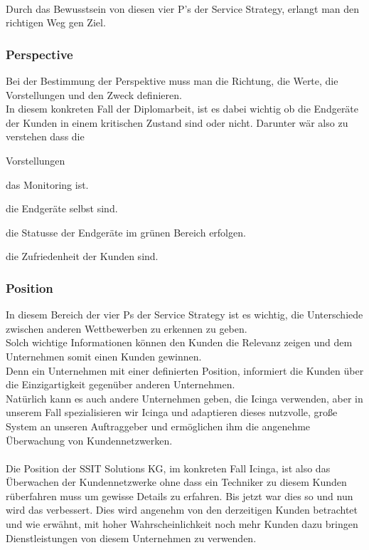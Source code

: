 {\noindent
\\
Durch das Bewusstsein von diesen vier P's der Service Strategy, erlangt man den richtigen Weg gen Ziel.

\subsubsection{Perspective}
\label{chap: Perspective}

Bei der Bestimmung der Perspektive muss man die Richtung, die Werte, die Vorstellungen und den Zweck definieren.
\\
In diesem konkreten Fall der Diplomarbeit, ist es dabei wichtig ob die Endgeräte der Kunden in einem kritischen Zustand
sind oder nicht. Darunter wär also zu verstehen dass die 
\begin{labeling}{Vorstellungen}
    \item [Richtung] das Monitoring ist.
    \item [Werte] die Endgeräte selbst sind.
    \item [Vorstellungen] die Statusse der Endgeräte im grünen Bereich erfolgen.
    \item [Zwecke] die Zufriedenheit der Kunden sind.
\end{labeling}

\subsubsection{Position}
\label{chap: Position}

In diesem Bereich der vier Ps der Service Strategy ist es wichtig, die Unterschiede zwischen anderen Wettbewerben zu erkennen zu geben.
\\
Solch wichtige Informationen können den Kunden die Relevanz zeigen und dem Unternehmen somit einen Kunden gewinnen.
\\
Denn ein Unternehmen mit einer definierten Position, informiert die Kunden über die Einzigartigkeit gegenüber anderen Unternehmen.
\\
Natürlich kann es auch andere Unternehmen geben, die Icinga verwenden, aber in unserem Fall spezialisieren wir Icinga und adaptieren dieses
nutzvolle, große System an unseren Auftraggeber und ermöglichen ihm die angenehme Überwachung von Kundennetzwerken.
\\\\
Die Position der SSIT Solutions KG, im konkreten Fall Icinga, ist also das Überwachen der Kundennetzwerke ohne dass ein Techniker zu diesem Kunden
rüberfahren muss um gewisse Details zu erfahren. Bis jetzt war dies so und nun wird das verbessert. Dies wird angenehm von den derzeitigen Kunden betrachtet
und wie erwähnt, mit hoher Wahrscheinlichkeit noch mehr Kunden dazu bringen Dienstleistungen von diesem Unternehmen zu verwenden.

}
